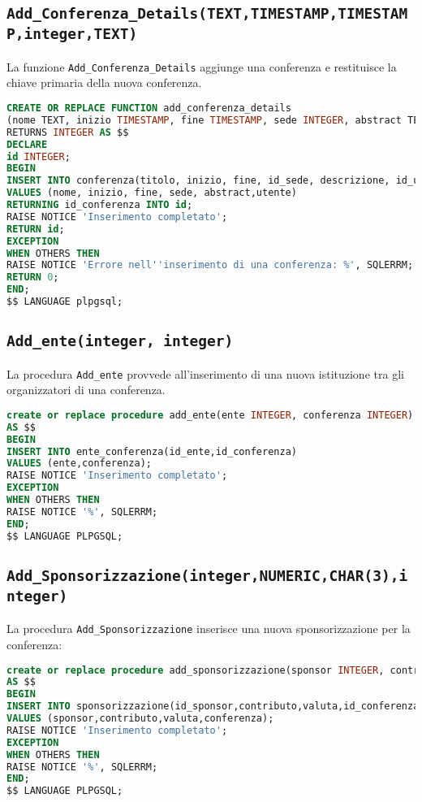 \subsection{\texttt{Add\_Conferenza\_Details(TEXT,TIMESTAMP,TIMESTAMP,integer,TEXT)}}
La funzione \texttt{Add\_Conferenza\_Details} aggiunge una conferenza e restituisce la chiave primaria della nuova conferenza.
\begin{lstlisting}[language=SQL,style=mystyle]
CREATE OR REPLACE FUNCTION add_conferenza_details
(nome TEXT, inizio TIMESTAMP, fine TIMESTAMP, sede INTEGER, abstract TEXT, utente INTEGER)
RETURNS INTEGER AS $$
DECLARE
id INTEGER;
BEGIN
INSERT INTO conferenza(titolo, inizio, fine, id_sede, descrizione, id_utente) 
VALUES (nome, inizio, fine, sede, abstract,utente)
RETURNING id_conferenza INTO id;
RAISE NOTICE 'Inserimento completato';
RETURN id;
EXCEPTION
WHEN OTHERS THEN
RAISE NOTICE 'Errore nell''inserimento di una conferenza: %', SQLERRM;
RETURN 0; 
END;
$$ LANGUAGE plpgsql;
\end{lstlisting}
\subsection{\texttt{Add\_ente(integer, integer)}}
La procedura \texttt{Add\_ente} provvede all'inserimento di una nuova istituzione tra gli organizzatori di una conferenza.
\begin{lstlisting}[language=SQL,style=mystyle]
create or replace procedure add_ente(ente INTEGER, conferenza INTEGER)
AS $$
BEGIN
INSERT INTO ente_conferenza(id_ente,id_conferenza)
VALUES (ente,conferenza);
RAISE NOTICE 'Inserimento completato';
EXCEPTION
WHEN OTHERS THEN
RAISE NOTICE '%', SQLERRM;
END;
$$ LANGUAGE PLPGSQL;
\end{lstlisting}
\subsection{\texttt{Add\_Sponsorizzazione(integer,NUMERIC,CHAR(3),integer)}}
La procedura \texttt{Add\_Sponsorizzazione} inserisce una nuova sponsorizzazione per la conferenza:
\begin{lstlisting}[language=SQL, style=mystyle]
create or replace procedure add_sponsorizzazione(sponsor INTEGER, contributo NUMERIC(1000,2), valuta CHAR(3), conferenza INTEGER)
AS $$
BEGIN
INSERT INTO sponsorizzazione(id_sponsor,contributo,valuta,id_conferenza)
VALUES (sponsor,contributo,valuta,conferenza);
RAISE NOTICE 'Inserimento completato';
EXCEPTION
WHEN OTHERS THEN
RAISE NOTICE '%', SQLERRM;
END;
$$ LANGUAGE PLPGSQL;
\end{lstlisting}
